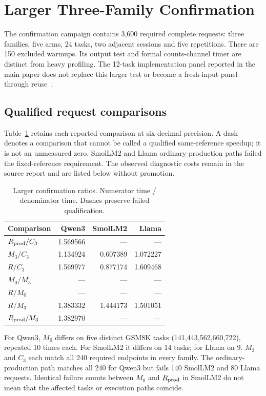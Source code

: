 \section{Larger Three-Family Confirmation}
\label{supp:confirmation}
The confirmation campaign contains 3,600 required complete requests: three families, five arms, 24 tasks, two adjacent sessions and five repetitions. There are 150 excluded warmups. Its output test and formal counts-channel timer are distinct from heavy profiling. The 12-task implementation panel reported in the main paper does not replace this larger test or become a fresh-input panel through reuse~\cite{rtxconfirm}.

\subsection{Qualified request comparisons}
Table~\ref{tab:confirmationratios} retains each reported comparison at six-decimal precision. A dash denotes a comparison that cannot be called a qualified same-reference speedup; it is not an unmeasured zero. SmolLM2 and Llama ordinary-production paths failed the fixed-reference requirement. The observed diagnostic costs remain in the source report and are listed below without promotion.

\begin{table}[t]\centering\small
\caption{Larger confirmation ratios. Numerator time / denominator time. Dashes preserve failed qualification.}
\label{tab:confirmationratios}
\begin{tabular}{@{}lrrr@{}}\toprule
Comparison&Qwen3&SmolLM2&Llama\\\midrule
$R_{\rm prod}/C_3$&1.569566&---&---\\
$M_3/C_3$&1.134924&0.607389&1.072227\\
$R/C_3$&1.569977&0.877174&1.609468\\
$M_0/M_3$&---&---&---\\
$R/M_0$&---&---&---\\
$R/M_3$&1.383332&1.444173&1.501051\\
$R_{\rm prod}/M_3$&1.382970&---&---\\\bottomrule
\end{tabular}
\end{table}

For Qwen3, $M_0$ differs on five distinct GSM8K tasks (141,443,562,660,722), repeated 10 times each. For SmolLM2 it differs on 14 tasks; for Llama on 9. $M_3$ and $C_3$ each match all 240 required endpoints in every family. The ordinary-production path matches all 240 for Qwen3 but fails 140 SmolLM2 and 80 Llama requests. Identical failure counts between $M_0$ and $R_{\rm prod}$ in SmolLM2 do not mean that the affected tasks or execution paths coincide.

